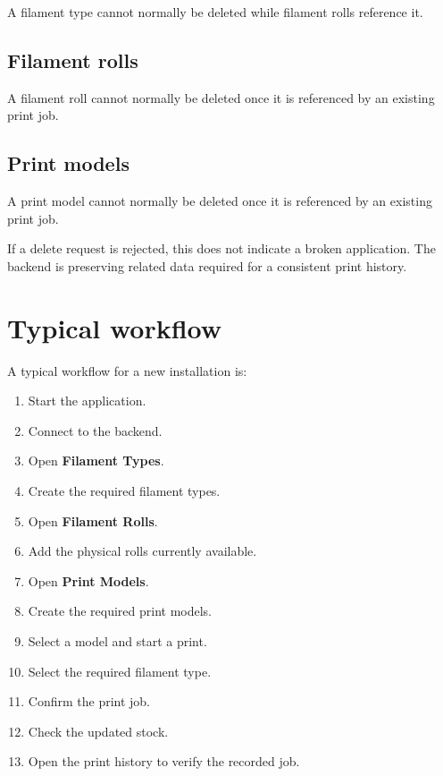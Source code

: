 \documentclass[a4paper,11pt]{article}
\begin{document}
A filament type cannot normally be deleted while filament rolls reference it.

\subsection{Filament rolls}

A filament roll cannot normally be deleted once it is referenced by an
existing print job.

\subsection{Print models}

A print model cannot normally be deleted once it is referenced by an
existing print job.

\begin{infobox}
If a delete request is rejected, this does not indicate a broken application.
The backend is preserving related data required for a consistent print
history.
\end{infobox}

\section{Typical workflow}

A typical workflow for a new installation is:

\begin{enumerate}
  \item Start the application.
  \item Connect to the backend.
  \item Open \textbf{Filament Types}.
  \item Create the required filament types.
  \item Open \textbf{Filament Rolls}.
  \item Add the physical rolls currently available.
  \item Open \textbf{Print Models}.
  \item Create the required print models.
  \item Select a model and start a print.
  \item Select the required filament type.
  \item Confirm the print job.
  \item Check the updated stock.
  \item Open the print history to verify the recorded job.
\end{enumerate}
\end{document}
